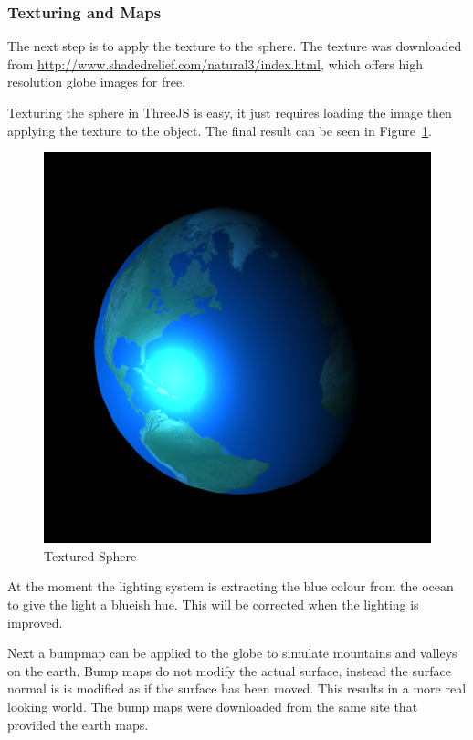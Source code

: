 \documentclass[]{article}
\begin{document}
\subsubsection{Texturing and Maps}

The next step is to apply the texture to the sphere.
The texture was downloaded from \url{http://www.shadedrelief.com/natural3/index.html},
which offers high resolution globe images for free.

Texturing the sphere in ThreeJS is easy, it just requires loading the image then applying the texture to the object.
The final result can be seen in Figure~\ref{fig:textured_sphere}.

\begin{figure}[H]
   \centering
   \includegraphics[width=0.5\linewidth]{images/textured_sphere}
   \caption{Textured Sphere}
   \label{fig:textured_sphere}
\end{figure}

At the moment the lighting system is extracting the blue colour from the ocean to give the light a blueish hue.
This will be corrected when the lighting is improved.

Next a bumpmap can be applied to the globe to simulate mountains and valleys on the earth.
Bump maps do not modify the actual surface, instead the surface normal is is modified as if the surface has been moved.
This results in a more real looking world.
The bump maps were downloaded from the same site that provided the earth maps.
\end{document}
